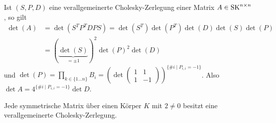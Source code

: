 \documentclass[../../main.tex]{subfiles}
\begin{document}
\begin{bem}\label{13.5.8}
	Ist $(S,P,D)$ eine verallgemeinerte Cholesky-Zerlegung einer Matrix $A\in \operatorname{SK}^{n\times n}$, so gilt
	\begin{align*}
		\det(A)&=\det(S^TP^TDPS)=\det(S^T)\det(P^T)\det(D)\det(S)\det(P)\\
		&=(\underbrace{\det(S)}_{=\pm 1})^2\det(P)^2\det(D)
	\end{align*}
	und $\det (P)=\prod_{k\in \{1\ldots n\}} B_i=\left(\det\begin{pmatrix*}1&1\\ 1 &-1\end{pmatrix*}\right)^{\{\# i\mid P_{i,i}=-1\}}$. Also $\det A=4^{\{\# i\mid P_{i,i}=-1\}}\det D$.
\end{bem}

\begin{satalgo}\label{13.5.9} 
	Jede symmetrische Matrix über einen Körper $K$ mit $2\neq 0$ besitzt eine verallgemeinerte Cholesky-Zerlegung.
\end{satalgo}
\end{document}
